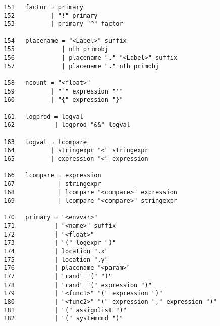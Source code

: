 \documentclass[11pt]{article}
\begin{document}
\begin{verbatim}
  151   factor = primary 
  152          | "!" primary 
  153          | primary "^" factor 

  154   placename = "<Label>" suffix 
  155             | nth primobj 
  156             | placename "." "<Label>" suffix 
  157             | placename "." nth primobj 

  158   ncount = "<float>" 
  159          | "`" expression "'" 
  160          | "{" expression "}" 

  161   logprod = logval 
  162           | logprod "&&" logval 

  163   logval = lcompare 
  164          | stringexpr "<" stringexpr 
  165          | expression "<" expression 

  166   lcompare = expression 
  167            | stringexpr 
  168            | lcompare "<compare>" expression 
  169            | lcompare "<compare>" stringexpr 

  170   primary = "<envvar>" 
  171           | "<name>" suffix 
  172           | "<float>" 
  173           | "(" logexpr ")" 
  174           | location ".x" 
  175           | location ".y" 
  176           | placename "<param>" 
  177           | "rand" "(" ")" 
  178           | "rand" "(" expression ")" 
  179           | "<func1>" "(" expression ")" 
  180           | "<func2>" "(" expression "," expression ")" 
  181           | "(" assignlist ")" 
  182           | "(" systemcmd ")" 
\end{verbatim}
\end{document}

